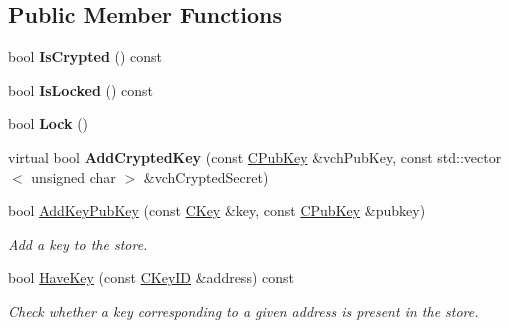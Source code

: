 \subsection*{Public Member Functions}
\begin{DoxyCompactItemize}
\item 
\mbox{\label{class_c_crypto_key_store_acc8fed44366c98fb481333ca6e867088}} 
bool {\bfseries Is\+Crypted} () const
\item 
\mbox{\label{class_c_crypto_key_store_a52919fa284a3aa10f1b4bd6018b6dbee}} 
bool {\bfseries Is\+Locked} () const
\item 
\mbox{\label{class_c_crypto_key_store_ab73ebcbfa6e0aaf271d0fff9369a6685}} 
bool {\bfseries Lock} ()
\item 
\mbox{\label{class_c_crypto_key_store_a9f4d2df95008205b2b9784c5f0e8e12b}} 
virtual bool {\bfseries Add\+Crypted\+Key} (const \mbox{\hyperlink{class_c_pub_key}{C\+Pub\+Key}} \&vch\+Pub\+Key, const std\+::vector$<$ unsigned char $>$ \&vch\+Crypted\+Secret)
\item 
\mbox{\label{class_c_crypto_key_store_a340109b8673267676a34664a76ed3274}} 
bool \mbox{\hyperlink{class_c_crypto_key_store_a340109b8673267676a34664a76ed3274}{Add\+Key\+Pub\+Key}} (const \mbox{\hyperlink{class_c_key}{C\+Key}} \&key, const \mbox{\hyperlink{class_c_pub_key}{C\+Pub\+Key}} \&pubkey)
\begin{DoxyCompactList}\small\item\em Add a key to the store. \end{DoxyCompactList}\item 
\mbox{\label{class_c_crypto_key_store_a6c115cf1fc4129b43c8846b3d51d8ff5}} 
bool \mbox{\hyperlink{class_c_crypto_key_store_a6c115cf1fc4129b43c8846b3d51d8ff5}{Have\+Key}} (const \mbox{\hyperlink{class_c_key_i_d}{C\+Key\+ID}} \&address) const
\begin{DoxyCompactList}\small\item\em Check whether a key corresponding to a given address is present in the store. \end{DoxyCompactList}\item 

\end{DoxyCompactItemize}
